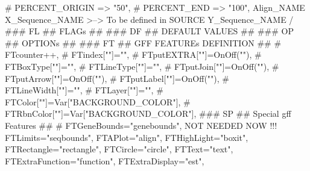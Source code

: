\documentclass[11pt]{article}
\def\nwendcode{\endtrivlist \endgroup} %
\let\nwdocspar=\par                    %
\begin{document}
\nwenddocs{}\endmoddef
# PERCENT_ORIGIN => "50",
# PERCENT_END => "100",
Align_NAME       \\
X_Sequence_NAME   >--> To be defined in SOURCE
Y_Sequence_NAME  /
### FL ## FLAGs ##
### DF ## DEFAULT VALUES ##
### OP ## OPTIONs ##
### FT ## GFF FEATUREs DEFINITION ##
  # FTcounter++,
  # FTindex[""]="",
  # FTputEXTRA[""]=OnOff(""),
  # FTBoxType[""]="",
  # FTLineType[""]="",
  # FTputJoin[""]=OnOff(""),
  # FTputArrow[""]=OnOff(""),
  # FTputLabel[""]=OnOff(""),
  # FTLineWidth[""]="",
  # FTLayer[""]="",
  # FTColor[""]=Var["BACKGROUND_COLOR"],
  # FTRbnColor[""]=Var["BACKGROUND_COLOR"],
### SP ## Special gff Features ##
  # FTGeneBounds="genebounds", NOT NEEDED NOW !!!
  FTLimits="seqbounds",
  FTAPlot="align",
  FTHighLight="boxit",
  FTRectangle="rectangle",
  FTCircle="circle",
  FTText="text",
  FTExtraFunction="function",
  FTExtraDisplay="est",
\nwendcode{}\nwdocspar
 
\begin{comment}
\nwenddocs{}\nwbegincode{405}\sublabel{NWgff18-cusN-1}\nwmargintag{{\nwtagstyle{}\subpageref{NWgff18-cusN-1}}}\moddef{custom-vars latex short~{\nwtagstyle{}\subpageref{NWgff18-cusN-1}}}\endmoddef
\nwalsodefined{\\{NWgff18-cusN-2}\\{NWgff18-cusN-3}\\{NWgff18-cusN-4}}\nwused{\\{NWgff18-LATN-1}}\nwendcode{}\nwbegindocs{406}\nwdocspar
\nwenddocs{}\nwbegincode{407}\sublabel{NWgff18-cusH-1}\nwmargintag{{\nwtagstyle{}\subpageref{NWgff18-cusH-1}}}\moddef{custom-vars latex~{\nwtagstyle{}\subpageref{NWgff18-cusH-1}}}\endmoddef
\\vnlitem\{title\}\{string\}\{align\\_name\} \\tp\{title\} sets the main title
for the figure, by default showing \\pr\{align\\_name\} in the form of
'sequence1\\_name x sequence2\\_name'.
\nwalsodefined{\\{NWgff18-cusH-2}\\{NWgff18-cusH-3}\\{NWgff18-cusH-4}}\nwused{\\{NWgff18-LATH-1}}\nwendcode{}\nwbegindocs{408}\nwdocspar
\end{comment}
\end{document}
